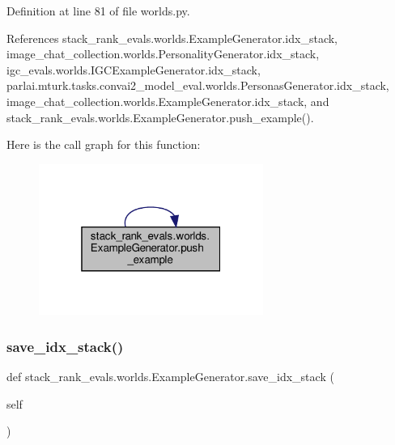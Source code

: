 Definition at line 81 of file worlds.\+py.



References stack\+\_\+rank\+\_\+evals.\+worlds.\+Example\+Generator.\+idx\+\_\+stack, image\+\_\+chat\+\_\+collection.\+worlds.\+Personality\+Generator.\+idx\+\_\+stack, igc\+\_\+evals.\+worlds.\+I\+G\+C\+Example\+Generator.\+idx\+\_\+stack, parlai.\+mturk.\+tasks.\+convai2\+\_\+model\+\_\+eval.\+worlds.\+Personas\+Generator.\+idx\+\_\+stack, image\+\_\+chat\+\_\+collection.\+worlds.\+Example\+Generator.\+idx\+\_\+stack, and stack\+\_\+rank\+\_\+evals.\+worlds.\+Example\+Generator.\+push\+\_\+example().

Here is the call graph for this function\+:
\nopagebreak
\begin{figure}[H]
\begin{center}
\leavevmode
\includegraphics[width=208pt]{classstack__rank__evals_1_1worlds_1_1ExampleGenerator_a75b62011b063cb2879cca50917383d0e_cgraph}
\end{center}
\end{figure}
\mbox{\label{classstack__rank__evals_1_1worlds_1_1ExampleGenerator_a47a988958641b4906b2d374938974cca}} 
\subsubsection{\texorpdfstring{save\+\_\+idx\+\_\+stack()}{save\_idx\_stack()}\hspace{0.1cm}{\footnotesize\ttfamily [1/2]}}
{\footnotesize\ttfamily def stack\+\_\+rank\+\_\+evals.\+worlds.\+Example\+Generator.\+save\+\_\+idx\+\_\+stack (\begin{DoxyParamCaption}\item[{}]{self }\end{DoxyParamCaption})}



